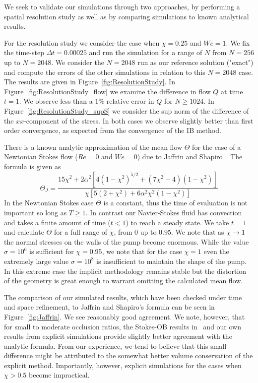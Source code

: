 We seek to validate our simulations through two approaches, by performing a spatial resolution study as well as by comparing simulations to known analytical results.

For the resolution study we consider the case when $\chi=0.25$ and $We=1$. We fix the time-step $\Delta t=0.00025$ and run the simulation for a range of $N$ from $N=256$ up to $N=2048$. We consider the $N=2048$ run as our reference solution ("exact")
and compute the errors of the other simulations in relation to this $N=2048$ case. The results are given in Figure~\ref{fig:ResolutionStudy}. In Figure~\ref{fig:ResolutionStudy_flow} we examine the difference in flow $Q$ at time $t=1$. We observe less than a $1\%$ relative error in $Q$ for $N \geq 1024$. In Figure~\ref{fig:ResolutionStudy_supS} we consider the sup norm of the difference of the $xx$-component of the stress. In both cases we observe slightly better than first order convergence, as expected from the convergence of the IB method. 

There is a known analytic approximation of the mean flow $\Theta$ for the case of a Newtonian Stokes flow ($Re=0$ and $We=0$) due to Jaffrin and Shapiro~\cite{jaffrin1971peristaltic}. The formula is given as
\begin{equation}
\label{eq:Jaffrin}
\Theta_J = \frac
{15\chi^2 + 2\alpha^2[4(1-\chi^2)^{5/2} + (7\chi^2-4)(1-\chi^2)]}
{\chi[5(2+\chi^2) + 6\alpha^2\chi^2(1-\chi^2)]}
\end{equation}
In the Newtonian Stokes case $\Theta$ is a constant, thus the time of evaluation is not important so long as $T\geq 1$. In contrast our Navier-Stokes fluid has convection and takes a finite amount of time ($t < 1$) to reach a steady state. We take $t=1$ and calculate $\Theta$ for a full range of $\chi$, from $0$ up to $0.95$. We note that as $\chi\to 1$ the normal stresses on the walls of the pump become enormous. While the value $\sigma=10^6$ is sufficient for $\chi=0.95$, we note that for the case $\chi=1$ even the extremely large value $\sigma=10^8$ is insufficient to maintain the shape of the pump. In this extreme case the implicit methodology remains stable but the distortion of the geometry is great enough to warrant omitting the calculated mean flow.

The comparison of our simulated results, which have been checked under time and space refinement,  to Jaffrin and Shapiro's formula can be seen in Figure~\ref{fig:Jaffrin}. We see reasonably good agreement. We note, however, that for small to moderate occlusion ratios,  the Stokes-OB results in~\cite{teran2008peristaltic}  and our own results from explicit simulations provide slightly better agreement with the analytic formula. From our experience,  we tend to believe that this small difference might be attributed to the somewhat better volume conservation of the explicit method. Importantly, however, explicit simulations for the cases when $\chi>0.5$ become impractical. 


